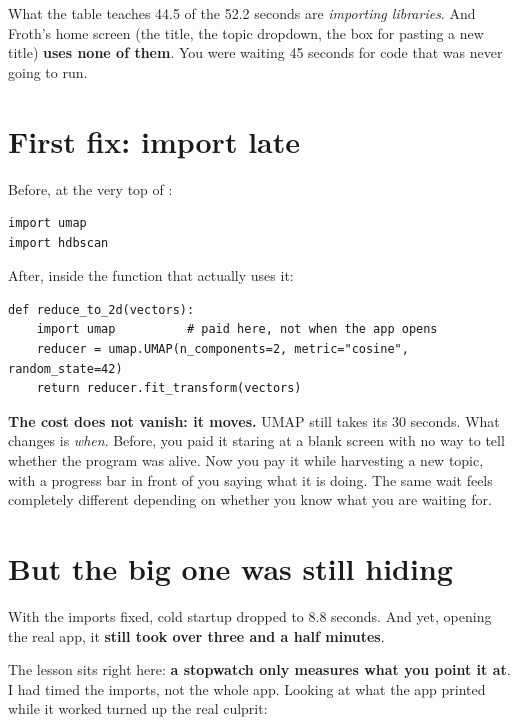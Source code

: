 \documentclass[11pt,a4paper]{article}
\begin{document}
\begin{concepto}{What the table teaches}
44.5 of the 52.2 seconds are \emph{importing libraries}. And Froth's home screen (the
title, the topic dropdown, the box for pasting a new title) \textbf{uses none of them}.
You were waiting 45 seconds for code that was never going to run.
\end{concepto}

\section{First fix: import late}

Before, at the very top of :

\begin{verbatim}
import umap
import hdbscan
\end{verbatim}

After, inside the function that actually uses it:

\begin{verbatim}
def reduce_to_2d(vectors):
    import umap          # paid here, not when the app opens
    reducer = umap.UMAP(n_components=2, metric="cosine", random_state=42)
    return reducer.fit_transform(vectors)
\end{verbatim}

\begin{ojo}
\textbf{The cost does not vanish: it moves.} UMAP still takes its 30 seconds. What
changes is \emph{when}. Before, you paid it staring at a blank screen with no way to tell
whether the program was alive. Now you pay it while harvesting a new topic, with a
progress bar in front of you saying what it is doing. The same wait feels completely
different depending on whether you know what you are waiting for.
\end{ojo}

\section{But the big one was still hiding}

With the imports fixed, cold startup dropped to 8.8 seconds. And yet, opening the real
app, it \textbf{still took over three and a half minutes}.

The lesson sits right here: \textbf{a stopwatch only measures what you point it at}. I
had timed the imports, not the whole app. Looking at what the app printed while it worked
turned up the real culprit:
\end{document}
